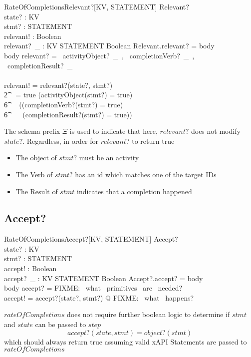 \documentclass[../main.tex]{subfiles}
\begin{document}
\begin{schema}{\Xi RateOfCompletionsRelevant?[KV, STATEMENT]}
  Relevant? \\
  state? : KV \\
  stmt? : STATEMENT \\
  relevant! : Boolean \\
  relevant?~\_ : KV \cross STATEMENT \fun Boolean
  \where
  Relevant.relevant? = \langle body \rangle \\
  \langle body \rangle \bindsto relevant? = \langle ~activityObject?~\_~, \langle ~completionVerb?~\_~, ~completionResult?~\_ \rangle  \rangle \\ ~ \\
  relevant! = relevant?(state?, stmt?) \\
  \t2 ~ = true \iff (activityObject(stmt?) = true) ~\land \\
  \t6 \ ~ ((completionVerb?(stmt?) = true) ~\lor \\
  \t6 \ \ ~ (completionResult?(stmt?) = true))
\end{schema}
The schema prefix $\Xi$ is used to indicate that here, $relevant?$ does not modify $state?$.
Regardless, in order for $relevant?$ to return true
\begin{itemize}
\item The object of $stmt?$ must be an activity
\item The Verb of $stmt?$ has an id which matches one of the target IDs
\item The Result of $stmt$ indicates that a completion happened
\end{itemize}

\subsection{Accept?}
\begin{schema}{RateOfCompletionsAccept?[KV, STATEMENT]}
  Accept? \\
  state? : KV \\
  stmt? : STATEMENT \\
  accept! : Boolean \\
  accept?~\_ : KV \cross STATEMENT \fun Boolean
  \where
  Accept?.accept? = \langle body \rangle \\
  \langle body \rangle \bindsto accept? = \langle FIXME: ~what ~primitives ~are ~needed? \rangle \\
  accept! = accept?(state?, stmt?) @ FIXME: ~what ~happens?
\end{schema}
$rateOfCompletions$ does not require further boolean logic to determine if $stmt$ and $state$ can be passed to $step$
$$accept?(state, stmt) = object?(stmt)$$
which should always return true assuming valid xAPI Statements are passed to $rateOfCompletions$
\end{document}
